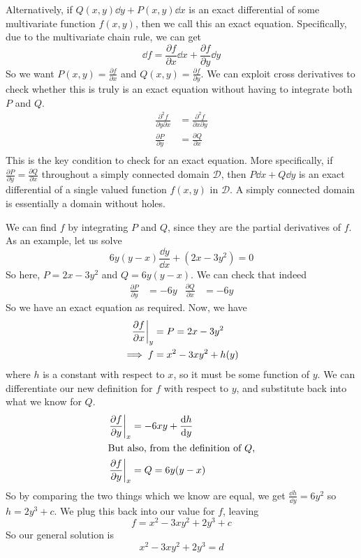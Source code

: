 Alternatively, if \(Q(x, y)\dd{y} + P(x, y)\dd{x}\) is an exact differential of some multivariate function \(f(x, y)\), then we call this an exact equation. Specifically, due to the multivariate chain rule, we can get
\[ \dd{f} = \frac{\partial f}{\partial x} \dd{x} + \frac{\partial f}{\partial y} \dd{y} \]
So we want \(P(x, y) = \frac{\partial f}{\partial x}\) and \(Q(x, y) = \frac{\partial f}{\partial y}\). We can exploit cross derivatives to check whether this is truly is an exact equation without having to integrate both \(P\) and \(Q\).
\begin{align*}
	\frac{\partial^2 f}{\partial y \partial x} & = \frac{\partial^2 f}{\partial x \partial y} \\
	\frac{\partial P}{\partial y}              & = \frac{\partial Q}{\partial x}              \\
\end{align*}
This is the key condition to check for an exact equation. More specifically, if \(\frac{\partial P}{\partial y} = \frac{\partial Q}{\partial x}\) throughout a simply connected domain \(\mathcal D\), then \(P \dd{x} + Q \dd{y}\) is an exact differential of a single valued function \(f(x, y)\) in \(\mathcal D\). A simply connected domain is essentially a domain without holes.

We can find \(f\) by integrating \(P\) and \(Q\), since they are the partial derivatives of \(f\). As an example, let us solve
\[ 6y(y-x)\frac{\dd{y}}{\dd{x}} + (2x - 3y^2) = 0 \]
So here, \(P = 2x - 3y^2\) and \(Q = 6y(y-x)\). We can check that indeed
\begin{align*}
	\frac{\partial P}{\partial y} & = -6y & \frac{\partial Q}{\partial x} & = -6y
\end{align*}
So we have an exact equation as required. Now, we have
\begin{align*}
	\eval{\frac{\partial f}{\partial x}}_y & = P = 2x - 3y^2      \\
	\implies f                             & = x^2 - 3xy^2 + h(y)
\end{align*}
where \(h\) is a constant with respect to \(x\), so it must be some function of \(y\). We can differentiate our new definition for \(f\) with respect to \(y\), and substitute back into what we know for \(Q\).
\begin{align*}
	\eval{\frac{\partial f}{\partial y}}_x & = -6xy + \frac{\dd{h}}{\dd{y}} \\
	\intertext{But also, from the definition of \(Q\),}
	\eval{\frac{\partial f}{\partial y}}_x & = Q = 6y(y-x)                  \\
\end{align*}
So by comparing the two things which we know are equal, we get \(\frac{\dd{h}}{\dd{y}} = 6y^2\) so \(h = 2y^3 + c\). We plug this back into our value for \(f\), leaving
\[ f = x^2 - 3xy^2 + 2y^3 + c \]
So our general solution is
\[ x^2 - 3xy^2 + 2y^3 = d \]
